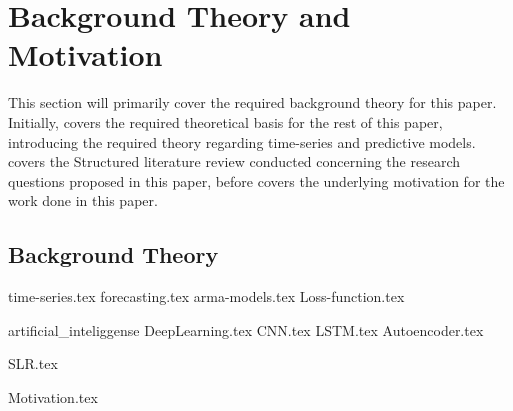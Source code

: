 \chapter{Background Theory and Motivation}\label{T-B}
\label{cha:TheoryAndBackground}


This section will primarily cover the required background theory for this paper.
Initially,  covers the required theoretical basis for the rest of this paper,
introducing the required theory regarding time-series and predictive models.
 covers the Structured literature review conducted concerning the research questions proposed in this paper,
before  covers the underlying motivation for the work done in this paper.



\section{Background Theory}
\label{section:BT:BackgroundTheory}
{time-series.tex}
{forecasting.tex}
{arma-models.tex}
{Loss-function.tex}

{artificial_inteliggense}
{DeepLearning.tex}
{CNN.tex}
{LSTM.tex}
{Autoencoder.tex}



{SLR.tex}


{Motivation.tex}
